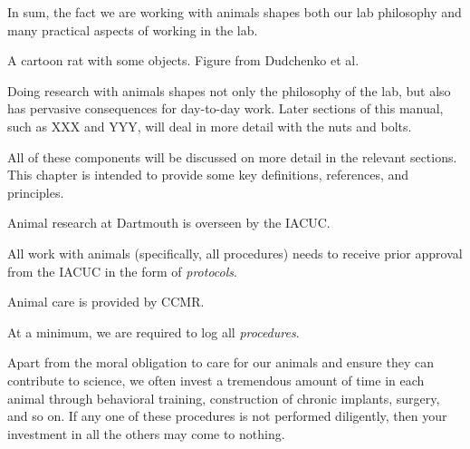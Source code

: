\documentclass{tufte-book}
\begin{document}
In sum, the fact we are working with animals shapes both our lab
philosophy and many practical aspects of working in the lab.

\begin{marginfigure}
\caption{A cartoon rat with some objects. Figure from Dudchenko et al.}
\label{fig:rat-with-objects}
\end{marginfigure}

Doing research with animals shapes not only the philosophy of the lab,
but also has pervasive consequences for day-to-day work. Later
sections of this manual, such as XXX and YYY, will deal in more detail
with the nuts and bolts.

All of these components will be discussed on more detail in the
relevant sections. This chapter is intended to provide some key
definitions, references, and principles.

Animal research at Dartmouth is overseen by the IACUC.

All work with animals (specifically, all procedures) needs to receive
prior approval from the IACUC in the form of
{\it protocols}.

Animal care is provided by CCMR.

At a minimum, we are required to log all {\it
  procedures}.

Apart from the moral obligation to care for our animals and ensure
they can contribute to science, we often invest a tremendous amount of
time in each animal through behavioral training, construction of
chronic implants, surgery, and so on. If any one of these procedures
is not performed diligently, then your investment in all the others
may come to nothing.
\end{document}
